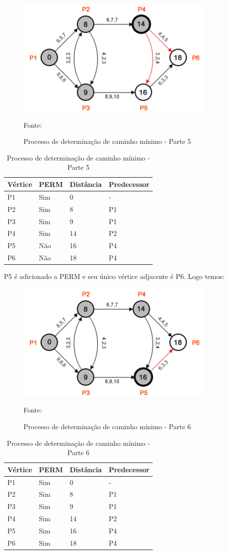 \begin{figure}[htbp]
\centering
 \includegraphics[width=.50\textwidth]{chapters/fig/leo6.png}
\caption{Processo de determinação de caminho mínimo - Parte 5}
Fonte: \cite{leonard}
\label{fig:leo6}
\end{figure}
\FloatBarrier
\begin{table}[htbp]
	\centering
	\begin{tabular}{l l l l}
	\toprule
	Vértice & PERM & Distância & Predecessor\\
	\midrule
	P1 & Sim & 0 & - \\
	P2 & Sim & 8 & P1 \\
	P3 & Sim & 9 & P1 \\
	P4 & Sim & 14 & P2 \\
	P5 & Não & 16 & P4 \\
	P6 & Não & 18 & P4 \\
	\bottomrule
	\end{tabular}
\caption{Processo de determinação de caminho mínimo - Parte 5}
 \label{tab:leotab5}
\end{table}

P5 é adicionado a PERM e seu único vértice adjacente é P6. Logo temos:

\begin{figure}[htbp]
\centering
 \includegraphics[width=.50\textwidth]{chapters/fig/leo7.png}
\caption{Processo de determinação de caminho mínimo - Parte 6}
Fonte: \cite{leonard}
\label{fig:leo7}
\end{figure}
\FloatBarrier
\begin{table}[htbp]
	\centering
	\begin{tabular}{l l l l}
	\toprule
	Vértice & PERM & Distância & Predecessor\\
	\midrule
	P1 & Sim & 0 & - \\
	P2 & Sim & 8 & P1 \\
	P3 & Sim & 9 & P1 \\
	P4 & Sim & 14 & P2 \\
	P5 & Sim & 16 & P4 \\
	P6 & Sim & 18 & P4 \\
	\bottomrule
	\end{tabular}
\caption{Processo de determinação de caminho mínimo - Parte 6}
 \label{tab:leotab5}
\end{table}
\FloatBarrier

